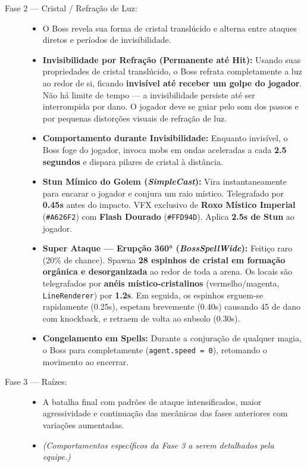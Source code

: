 \documentclass[a4paper,12pt]{report}
\begin{document}
\begin{description}
    \item[Fase 2 --- Cristal / Refração de Luz:]
    \begin{itemize}
        \item O Boss revela sua forma de cristal translúcido e alterna entre ataques diretos e períodos de invisibilidade.
        \item \textbf{Invisibilidade por Refração (Permanente até Hit):} Usando suas propriedades de cristal translúcido, o Boss refrata completamente a luz ao redor de si, ficando \textbf{invisível até receber um golpe do jogador}. Não há limite de tempo --- a invisibilidade persiste até ser interrompida por dano. O jogador deve se guiar pelo som dos passos e por pequenas distorções visuais de refração de luz.
        \item \textbf{Comportamento durante Invisibilidade:} Enquanto invisível, o Boss foge do jogador, invoca mobs em ondas aceleradas a cada \textbf{2.5 segundos} e dispara pilares de cristal à distância.
        \item \textbf{Stun Mímico do Golem (\textit{SimpleCast}):} Vira instantaneamente para encarar o jogador e conjura um raio místico. Telegrafado por \textbf{0.45s} antes do impacto. VFX exclusivo de \textbf{Roxo Místico Imperial} (\texttt{\#A626F2}) com \textbf{Flash Dourado} (\texttt{\#FFD94D}). Aplica \textbf{2.5s de Stun} ao jogador.
        \item \textbf{Super Ataque --- Erupção 360° (\textit{BossSpellWide}):} Feitiço raro (20\% de chance). Spawna \textbf{28 espinhos de cristal em formação orgânica e desorganizada} ao redor de toda a arena. Os locais são telegrafados por \textbf{anéis místico-cristalinos} (vermelho/magenta, \texttt{LineRenderer}) por \textbf{1.2s}. Em seguida, os espinhos erguem-se rapidamente (0.25s), espetam brevemente (0.40s) causando 45 de dano com knockback, e retraem de volta ao subsolo (0.30s).
        \item \textbf{Congelamento em Spells:} Durante a conjuração de qualquer magia, o Boss para completamente (\texttt{agent.speed = 0}), retomando o movimento ao encerrar.
    \end{itemize}

    \item[Fase 3 --- Raízes:]
    \begin{itemize}
        \item A batalha final com padrões de ataque intensificados, maior agressividade e continuação das mecânicas das fases anteriores com variações aumentadas.
        \item \textit{(Comportamentos específicos da Fase 3 a serem detalhados pela equipe.)}
    \end{itemize}


\end{description}
\end{document}
